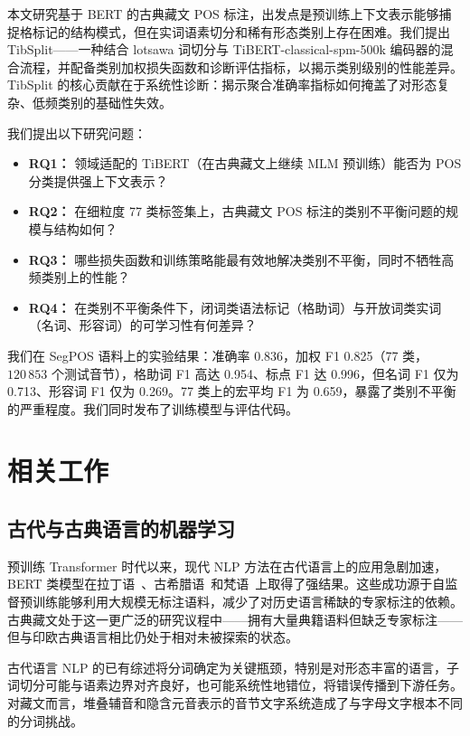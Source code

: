 \documentclass[11pt,a4paper]{article}
\begin{document}
本文研究基于 BERT 的古典藏文 POS 标注，出发点是预训练上下文表示能够捕捉格标记的结构模式，但在实词语素切分和稀有形态类别上存在困难。我们提出 TibSplit——一种结合 lotsawa 词切分与 TiBERT-classical-spm-500k 编码器的混合流程，并配备类别加权损失函数和诊断评估指标，以揭示类别级别的性能差异。TibSplit 的核心贡献在于系统性诊断：揭示聚合准确率指标如何掩盖了对形态复杂、低频类别的基础性失效。

我们提出以下研究问题：

\begin{itemize}
    \item \textbf{RQ1：} 领域适配的 TiBERT（在古典藏文上继续 MLM 预训练）能否为 POS 分类提供强上下文表示？
    \item \textbf{RQ2：} 在细粒度 77 类标签集上，古典藏文 POS 标注的类别不平衡问题的规模与结构如何？
    \item \textbf{RQ3：} 哪些损失函数和训练策略能最有效地解决类别不平衡，同时不牺牲高频类别上的性能？
    \item \textbf{RQ4：} 在类别不平衡条件下，闭词类语法标记（格助词）与开放词类实词（名词、形容词）的可学习性有何差异？
\end{itemize}

我们在 SegPOS 语料上的实验结果：准确率 0.836，加权 F1 0.825（77 类，$120\,853$ 个测试音节），格助词 F1 高达 0.954、标点 F1 达 0.996，但名词 F1 仅为 0.713、形容词 F1 仅为 0.269。77 类上的宏平均 F1 为 0.659，暴露了类别不平衡的严重程度。我们同时发布了训练模型与评估代码。

\section{相关工作}

\subsection{古代与古典语言的机器学习}

预训练 Transformer 时代以来，现代 NLP 方法在古代语言上的应用急剧加速，BERT 类模型在拉丁语~\cite{labrosse2020}、古希腊语~\cite{greekbert}和梵语~\cite{classicalnlp}上取得了强结果。这些成功源于自监督预训练能够利用大规模无标注语料，减少了对历史语言稀缺的专家标注的依赖。古典藏文处于这一更广泛的研究议程中——拥有大量典籍语料但缺乏专家标注——但与印欧古典语言相比仍处于相对未被探索的状态。

古代语言 NLP 的已有综述将分词确定为关键瓶颈，特别是对形态丰富的语言，子词切分可能与语素边界对齐良好，也可能系统性地错位，将错误传播到下游任务。对藏文而言，堆叠辅音和隐含元音表示的音节文字系统造成了与字母文字根本不同的分词挑战。
\end{document}
